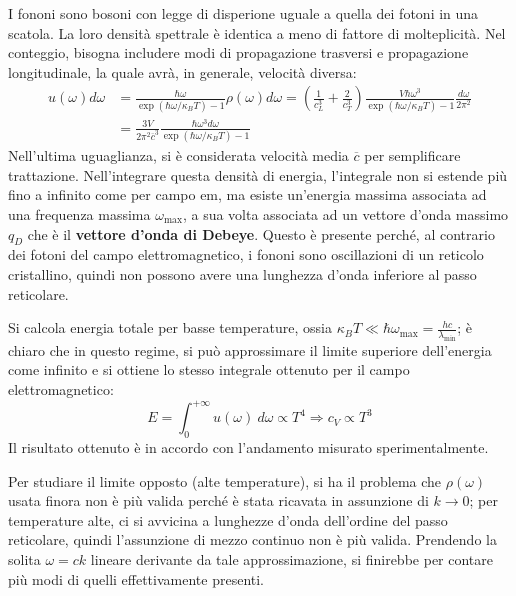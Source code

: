 \documentclass[10pt, a4paper]{scrartcl}
\numberwithin{equation}{subsection}
\theoremstyle{style1}
\theoremstyle{style2}
\begin{document}
I fononi sono bosoni con legge di disperione uguale a quella dei fotoni in una scatola.
La loro densit\`a spettrale \`e identica a meno di fattore di molteplicit\`a.
Nel conteggio, bisogna includere modi di propagazione trasversi e propagazione longitudinale, la quale avr\`a, in generale, velocit\`a diversa:
\begin{equation}
	\begin{split}
		u(\omega) d\omega &= \frac{\hbar \omega}{\exp(\hbar \omega/\kappa _B T) - 1} \rho (\omega) d\omega = \left(\frac{1}{c_L^3  }+\frac{2}{c_T ^3}\right) \frac{V\hbar \omega^3}{\exp(\hbar \omega / \kappa _B T)-1}\frac{d\omega}{2\pi^2}\\
		&= \frac{3V}{2\pi^2 \overline{c}^3} \frac{\hbar  \omega^3 d\omega}{\exp(\hbar \omega / \kappa _B T ) -1}
	\end{split}
\end{equation}
Nell'ultima uguaglianza, si \`e considerata velocit\`a media $\overline{c}$ per semplificare trattazione. 
Nell'integrare questa densit\`a di energia, l'integrale non si estende pi\`u fino a infinito come per campo em, ma esiste un'energia massima associata ad una frequenza massima $\omega_\text{max}$, a sua volta associata ad un vettore d'onda massimo $q_D$ che \`e il \textbf{vettore d'onda di Debeye}. Questo \`e presente perch\'e, al contrario dei fotoni del campo elettromagnetico, i fononi sono oscillazioni di un reticolo cristallino, quindi non possono avere una lunghezza d'onda inferiore al passo reticolare.

Si calcola energia totale per basse temperature, ossia $\kappa _B T \ll \hbar \omega_\text{max} = \frac{hc}{\lambda _\text{min}}$; \`e chiaro che in questo regime, si pu\`o approssimare il limite superiore dell'energia come infinito e si ottiene lo stesso integrale ottenuto per il campo elettromagnetico:
\begin{equation}
	E = \int_{0} ^{+\infty} u(\omega) \ d\omega \propto T^4 \Rightarrow c_V \propto T^3
\end{equation}
Il risultato ottenuto \`e in accordo con l'andamento misurato sperimentalmente.

Per studiare il limite opposto (alte temperature), si ha il problema che $\rho (\omega)$ usata finora non \`e pi\`u valida perch\'e \`e stata ricavata in assunzione di $k\to 0$; 
per temperature alte, ci si avvicina a lunghezze d'onda dell'ordine del passo reticolare, quindi l'assunzione di mezzo continuo non \`e pi\`u valida.
Prendendo la solita $\omega=ck$ lineare derivante da tale approssimazione, si finirebbe per contare pi\`u modi di quelli effettivamente presenti.
\end{document}
